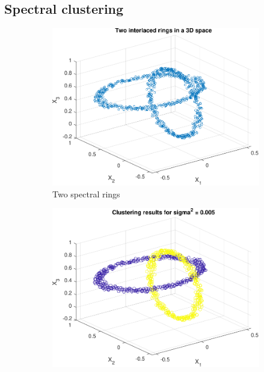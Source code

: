 \documentclass{article}
\begin{document}
    \subsection{Spectral clustering} 
        \begin{figure}[h]
             \centering
             \begin{subfigure}[b]{0.3\textwidth}
                 \includegraphics[width=\textwidth]{Assignment 3/figures/1_2/spectral_rings_data.pdf}
                 \caption{Two spectral rings}
                 \label{fig:spectral_1}
             \end{subfigure}
             \hfill
             \begin{subfigure}[b]{0.3\textwidth}
                 \includegraphics[width=\textwidth]{Assignment 3/figures/1_2/spectral_rings_sig2_0.005.pdf}

\end{subfigure}
\end{figure}
\end{document}
